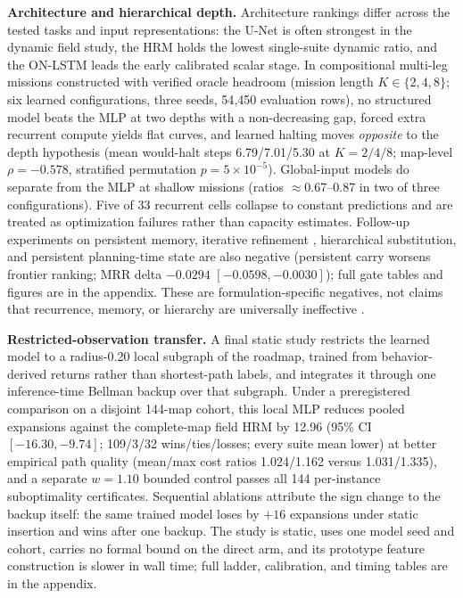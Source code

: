\documentclass[letterpaper]{article} %
\begin{document}
\textbf{Architecture and hierarchical depth.} Architecture rankings differ across the tested tasks and input representations: the U-Net is often strongest in the dynamic field study, the HRM holds the lowest single-suite dynamic ratio, and the ON-LSTM leads the early calibrated scalar stage. In compositional multi-leg missions constructed with verified oracle headroom (mission length $K \in \{2,4,8\}$; six learned configurations, three seeds, 54{,}450 evaluation rows), no structured model beats the MLP at two depths with a non-decreasing gap, forced extra recurrent compute yields flat curves, and learned halting moves \emph{opposite} to the depth hypothesis (mean would-halt steps 6.79/7.01/5.30 at $K{=}2/4/8$; map-level $\rho=-0.578$, stratified permutation $p=5\times10^{-5}$). Global-input models do separate from the MLP at shallow missions (ratios ${\approx}$0.67--0.87 in two of three configurations). Five of 33 recurrent cells collapse to constant predictions and are treated as optimization failures rather than capacity estimates. Follow-up experiments on persistent memory, iterative refinement \citep{tamar2016vin,lee2018gppn}, hierarchical substitution, and persistent planning-time state are also negative (persistent carry worsens frontier ranking; MRR delta $-0.0294$ $[-0.0598,-0.0030]$); full gate tables and figures are in the appendix. These are formulation-specific negatives, not claims that recurrence, memory, or hierarchy are universally ineffective \citep{jolicoeur2025trm,czechowski2021subgoal}.

\textbf{Restricted-observation transfer.} A final static study restricts the learned model to a radius-0.20 local subgraph of the roadmap, trained from behavior-derived returns rather than shortest-path labels, and integrates it through one inference-time Bellman backup over that subgraph. Under a preregistered comparison on a disjoint 144-map cohort, this local MLP reduces pooled expansions against the complete-map field HRM by 12.96 (95\% CI $[-16.30,-9.74]$; 109/3/32 wins/ties/losses; every suite mean lower) at better empirical path quality (mean/max cost ratios 1.024/1.162 versus 1.031/1.335), and a separate $w{=}1.10$ bounded control passes all 144 per-instance suboptimality certificates. Sequential ablations attribute the sign change to the backup itself: the same trained model loses by $+16$ expansions under static insertion and wins after one backup. The study is static, uses one model seed and cohort, carries no formal bound on the direct arm, and its prototype feature construction is slower in wall time; full ladder, calibration, and timing tables are in the appendix.
\end{document}
